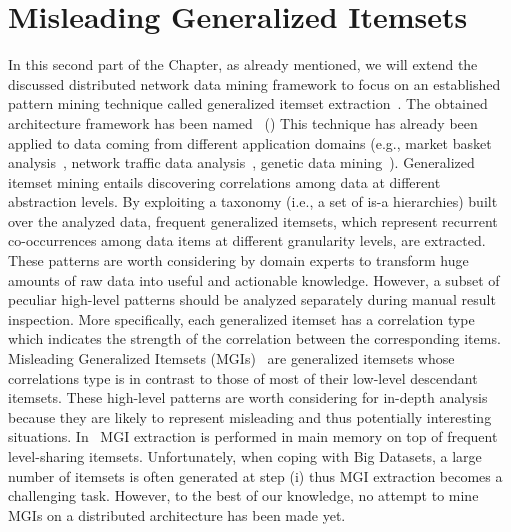 
\section{Misleading Generalized Itemsets}\label{mgi_intro}
%
%
In this second part of the Chapter, as already mentioned, we will extend the discussed distributed network data mining framework to focus on an established pattern mining technique called generalized itemset extraction~\cite{Srikant1995}. The obtained architecture framework has been named \SeTAB\ (\SeTA )
This technique has already been applied to data coming from different application domains (e.g., market basket analysis~\cite{Srikant1995}, network traffic data analysis~\cite{IS2010}, genetic data mining~\cite{BaralisCCCG13}). 
Generalized itemset mining entails discovering correlations among data at different abstraction levels. By exploiting a taxonomy (i.e., a set of is-a hierarchies) built over the analyzed data, 
frequent generalized itemsets, which represent recurrent co-occurrences among data items at different granularity levels, are extracted. 
These patterns are worth considering by domain experts to transform huge amounts of raw data into useful and actionable knowledge. 
However, a subset of peculiar high-level patterns should be analyzed separately during manual result inspection.  
More specifically, each generalized itemset has a correlation type which indicates the strength of the correlation between the corresponding items. 
Misleading Generalized Itemsets (MGIs)~\cite{MGI} are generalized itemsets
whose correlations type is in contrast to those of most of their low-level descendant itemsets.
These high-level patterns are worth considering for in-depth analysis because they are likely to represent misleading and thus potentially interesting situations. 
In~\cite{MGI} MGI extraction is performed in main memory on top of frequent level-sharing itemsets. 
Unfortunately, when coping with Big Datasets, a large number of itemsets is often generated at step (i) thus MGI extraction becomes a challenging task. 
However, to the best of our knowledge, no attempt to mine MGIs on a distributed architecture has been made yet. 

